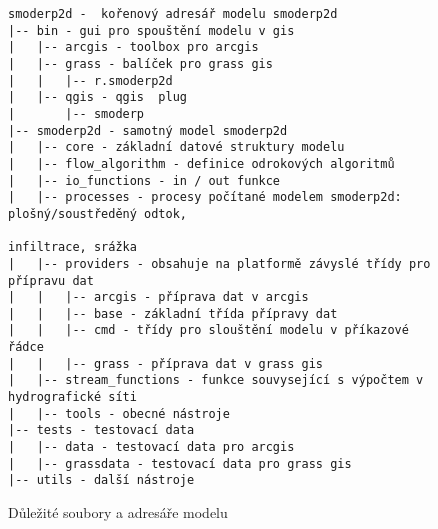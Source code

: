 

\begin{figure}[t!]
  \centering
    \begin{verbatim}
smoderp2d -  kořenový adresář modelu smoderp2d
|-- bin	- gui pro spouštění modelu v gis
|   |-- arcgis - toolbox pro arcgis
|   |-- grass - balíček pro grass gis
|   |   |-- r.smoderp2d
|   |-- qgis - qgis  plug
|       |-- smoderp
|-- smoderp2d - samotný model smoderp2d
|   |-- core - základní datové struktury modelu
|   |-- flow_algorithm - definice odrokových algoritmů
|   |-- io_functions - in / out funkce
|   |-- processes - procesy počítané modelem smoderp2d: plošný/soustředěný odtok, 
                                                        infiltrace, srážka
|   |-- providers - obsahuje na platformě závyslé třídy pro přípravu dat
|   |   |-- arcgis - příprava dat v arcgis
|   |   |-- base - základní třída přípravy dat
|   |   |-- cmd - třídy pro slouštění modelu v příkazové řádce
|   |   |-- grass - příprava dat v grass gis
|   |-- stream_functions - funkce souvysející s výpočtem v hydrografické síti
|   |-- tools - obecné nástroje
|-- tests - testovací data
|   |-- data - testovací data pro arcgis
|   |-- grassdata - testovací data pro grass gis
|-- utils - další nástroje
\end{verbatim}
  \caption{Důležité soubory a adresáře modelu \smod}
  \label{fig:adresare}
\end{figure}


